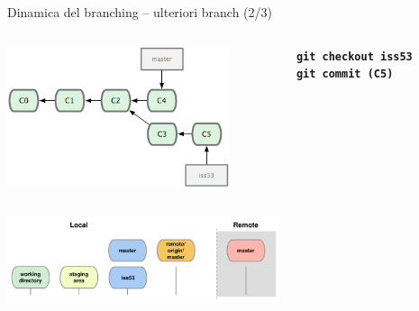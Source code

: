 \documentclass{beamer}
\begin{document}
\begin{frame}{\centerline{Dinamica del branching -- ulteriori branch (2/3)}}
  \begin{columns}
    \begin{column}{0.6\linewidth}
      \begin{center}
        \includegraphics[width=6.5cm]{UniBo.IDSEPC.A2023.LavoroCondiviso/18333fig0315-tn}
      \end{center}
    \end{column}
    \begin{column}{0.4\linewidth}
      \begin{center}
        \texttt{\textbf{git checkout iss53}}\\
        \texttt{\textbf{git commit (C5)}}
      \end{center}
    \end{column}
  \end{columns}
  \begin{center}
    \includegraphics[width=8cm]{UniBo.IDSEPC.A2023.LavoroCondiviso/git-checkout}
  \end{center}
\end{frame}
\end{document}
